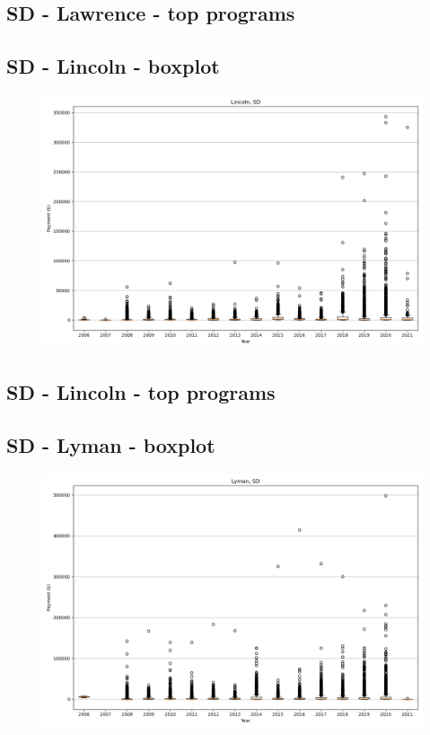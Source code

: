 \subsection*{SD - Lawrence - top programs}

\newpage
\subsection*{SD - Lincoln - boxplot}
\begin{figure}[h]
\centering
\includegraphics[width=7in]{../output/boxplots/counties/Lincoln-SD_boxplot.png}
\end{figure}


\subsection*{SD - Lincoln - top programs}

\newpage
\subsection*{SD - Lyman - boxplot}
\begin{figure}[h]
\centering
\includegraphics[width=7in]{../output/boxplots/counties/Lyman-SD_boxplot.png}
\end{figure}


